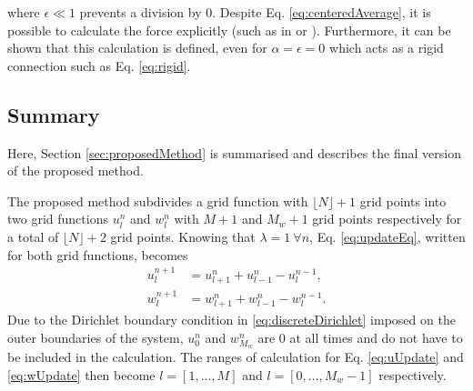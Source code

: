where $\epsilon \ll 1$ prevents a division by 0. Despite Eq. \eqref{eq:centeredAverage}, it is possible to calculate the force explicitly (such as in \cite{bilbao2009} or \cite{bilbao2009Dafx}). Furthermore, it can be shown that this calculation is defined, even for $\alpha  = \epsilon = 0$ which acts as a rigid connection such as Eq. \eqref{eq:rigid}.

% 

\subsection{Summary}
Here, Section \ref{sec:proposedMethod} is summarised and describes the final version of the proposed method.

The proposed method subdivides a grid function with $\lfloor N\rfloor +1$ grid points into two grid functions $u_l^n$ and $w_l^n$ with $M+1$ and $M_w+1$ grid points respectively for a total of $\lfloor N\rfloor +2$ grid points. Knowing that $\lambda=1\ \forall n$, Eq. \eqref{eq:updateEq}, written for both grid functions, becomes 
\begin{subequations}\label{eq:uwUpdates}
    \begin{align}
        u_l^{n+1} &= u_{l+1}^n + u_{l-1}^n - u_l^{n-1},\label{eq:uUpdate}\\
        w_l^{n+1} &= w_{l+1}^n + w_{l-1}^n - w_l^{n-1}\label{eq:wUpdate}.
    \end{align}
\end{subequations}
%
Due to the Dirichlet boundary condition in \eqref{eq:discreteDirichlet} imposed on the outer boundaries of the system, $u_0^n$ and $w_{M_w}^n$ are $0$ at all times and do not have to be included in the calculation. The ranges of calculation for Eq. \eqref{eq:uUpdate} and \eqref{eq:wUpdate} then become $l = [1, \hdots, M]$ and $l = [0, \hdots, M_w - 1]$ respectively. 

